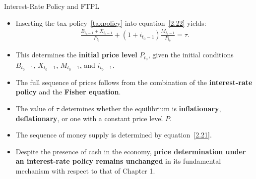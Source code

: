 \documentclass[11pt,aspectratio=169]{beamer}
\begin{document}
\begin{frame}{Interest-Rate Policy and FTPL}
\small

\begin{itemize}

    \item Inserting the tax policy~\eqref{taxpolicy} into equation~\eqref{2.22} yields:
    \begin{align*}
        \frac{B_{t_0-1} + X_{t_0-1}}{P_{t_0}}
        + (1 + i_{t_0-1})\frac{M_{t_0-1}}{P_{t_0}}
        = \tau.
    \end{align*}

    \vspace{0.4em}

    \item This determines the \textbf{initial price level} $P_{t_0}$, 
    given the initial conditions $B_{t_0-1},\, X_{t_0-1},\, M_{t_0-1}$, and $i_{t_0-1}$.

    \vspace{0.4em}

    \item The full sequence of prices follows from the combination of the \textbf{interest-rate policy} and the \textbf{Fisher equation}.

    \vspace{0.4em}

    \item The value of $\tau$ determines whether the equilibrium is \textbf{inflationary}, \textbf{deflationary}, 
    or one with a constant price level $\bar{P}$.

    \vspace{0.4em}

    \item The sequence of money supply is determined by equation~\eqref{2.21}.

    \vspace{0.4em}

    \item Despite the presence of cash in the economy, 
    \textbf{price determination under an interest-rate policy remains unchanged} in its fundamental mechanism with respect to that of Chapter 1.
    
\end{itemize}

\end{frame}
\end{document}
